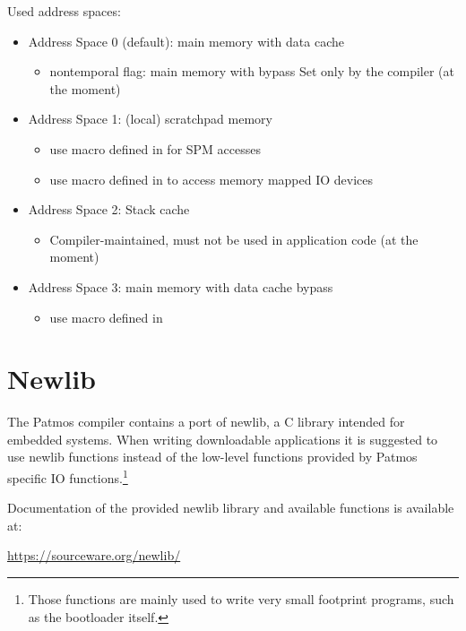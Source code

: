 Used address spaces:
\begin{itemize}
\item Address Space 0 (default): main memory with data cache
  \begin{itemize}
  \item nontemporal flag: main memory with bypass
      Set only by the compiler (at the moment)
  \end{itemize}
\item Address Space 1: (local) scratchpad memory
  \begin{itemize}
  \item use macro  defined in  for SPM accesses
  \item use macro  defined in  to access memory mapped IO devices
  \end{itemize}
\item Address Space 2: Stack cache
  \begin{itemize}
  \item Compiler-maintained, must not be used in application code (at the moment)
  \end{itemize}
\item Address Space 3: main memory with data cache bypass
  \begin{itemize}
  \item use macro  defined in 
  \end{itemize}
\end{itemize}

\section{Newlib}

The Patmos compiler contains a port of newlib, a C library intended for embedded systems. When  writing
downloadable applications it is suggested to use newlib functions instead of the low-level functions provided
by Patmos specific IO functions.\footnote{Those functions are mainly used to write very small footprint programs,
such as the bootloader itself.}

Documentation of the provided newlib library and available functions is available at:

\url{https://sourceware.org/newlib/}

